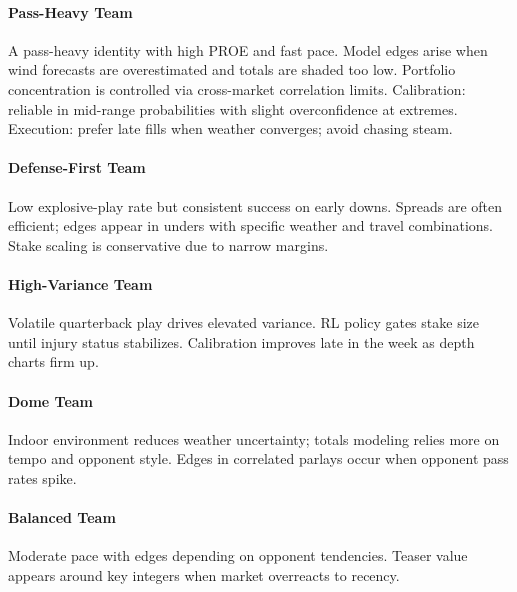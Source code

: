 \paragraph{Pass-Heavy Team} A pass-heavy identity with high PROE and fast pace. Model edges arise when wind forecasts are overestimated and totals are shaded too low. Portfolio concentration is controlled via cross-market correlation limits. Calibration: reliable in mid-range probabilities with slight overconfidence at extremes. Execution: prefer late fills when weather converges; avoid chasing steam.

\paragraph{Defense-First Team} Low explosive-play rate but consistent success on early downs. Spreads are often efficient; edges appear in unders with specific weather and travel combinations. Stake scaling is conservative due to narrow margins.

\paragraph{High-Variance Team} Volatile quarterback play drives elevated variance. RL policy gates stake size until injury status stabilizes. Calibration improves late in the week as depth charts firm up.

\paragraph{Dome Team} Indoor environment reduces weather uncertainty; totals modeling relies more on tempo and opponent style. Edges in correlated parlays occur when opponent pass rates spike.

\paragraph{Balanced Team} Moderate pace with edges depending on opponent tendencies. Teaser value appears around key integers when market overreacts to recency.

